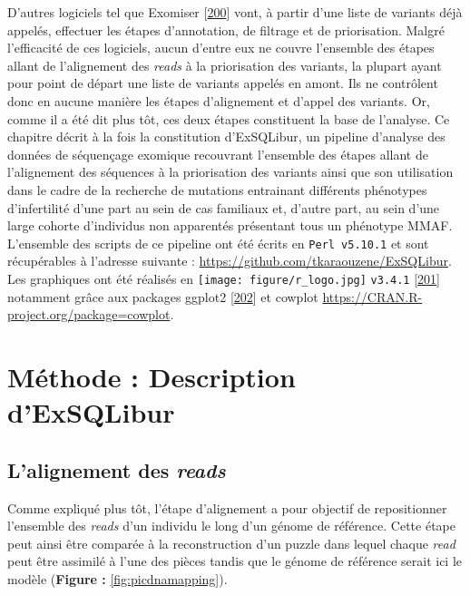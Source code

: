 \documentclass[12pt,a4paper,twoside]{ugathesis}
\theoremstyle{definition}
\theoremstyle{definition}
\theoremstyle{definition}
\theoremstyle{remark}
\begin{document}
D'autres logiciels tel que Exomiser
{[}\protect\hyperlink{ref-Robinson2014}{200}{]} vont, à partir d'une
liste de variants déjà appelés, effectuer les étapes d'annotation, de
filtrage et de priorisation. Malgré l'efficacité de ces logiciels, aucun
d'entre eux ne couvre l'ensemble des étapes allant de l'alignement des
\emph{reads} à la priorisation des variants, la plupart ayant pour point
de départ une liste de variants appelés en amont. Ils ne contrôlent donc
en aucune manière les étapes d'alignement et d'appel des variants. Or,
comme il a été dit plus tôt, ces deux étapes constituent la base de
l'analyse. Ce chapitre décrit à la fois la constitution d'ExSQLibur, un
pipeline d'analyse des données de séquençage exomique recouvrant
l'ensemble des étapes allant de l'alignement des séquences à la
priorisation des variants ainsi que son utilisation dans le cadre de la
recherche de mutations entrainant différents phénotypes d'infertilité
d'une part au sein de cas familiaux et, d'autre part, au sein d'une
large cohorte d'individus non apparentés présentant tous un phénotype
MMAF. L'ensemble des scripts de ce pipeline ont été écrits en
\texttt{Perl\ v5.10.1} et sont récupérables à l'adresse suivante :
\url{https://github.com/tkaraouzene/ExSQLibur}. Les graphiques ont été
réalisés en \texttt{[image: figure/r\_logo.jpg]}
\texttt{v3.4.1} {[}\protect\hyperlink{ref-RCoreTeam2017}{201}{]}
notamment grâce aux packages ggplot2
{[}\protect\hyperlink{ref-Wickham2009}{202}{]} et cowplot
\url{https://CRAN.R-project.org/package=cowplot}.

\newpage

\section{Méthode : Description
d'ExSQLibur}\label{methode-description-dexsqlibur}

\subsection{\texorpdfstring{L'alignement des
\emph{reads}}{L'alignement des reads}}\label{lalignement-des-reads}

Comme expliqué plus tôt, l'étape d'alignement a pour objectif de
repositionner l'ensemble des \emph{reads} d'un individu le long d'un
génome de référence. Cette étape peut ainsi être comparée à la
reconstruction d'un puzzle dans lequel chaque \emph{read} peut être
assimilé à l'une des pièces tandis que le génome de référence serait ici
le modèle (\textbf{Figure : }\ref{fig:picdnamapping}).
\end{document}
